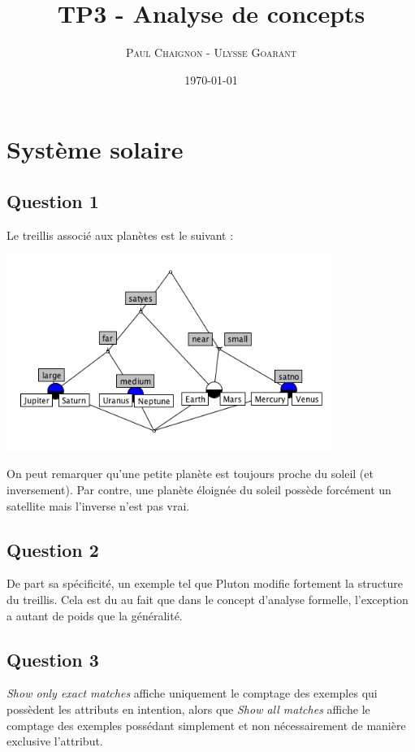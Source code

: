 \documentclass[a4paper,12pt]{article}
\title{TP3 - Analyse de concepts}
\author{\textsc{Paul Chaignon} - \textsc{Ulysse Goarant}}
\date{\today}
\begin{document}
\maketitle


\section{Système solaire}

\subsection*{Question 1}

Le treillis associé aux planètes est le suivant :

\includegraphics[width=400px]{question1.png}

On peut remarquer qu'une petite planète est toujours proche du soleil (et inversement).
Par contre, une planète éloignée du soleil possède forcément un satellite mais l'inverse n'est pas vrai.


\subsection*{Question 2}

De part sa spécificité, un exemple tel que Pluton modifie fortement la structure du treillis.
Cela est du au fait que dans le concept d'analyse formelle, l'exception a autant de poids que la généralité.


\subsection*{Question 3}

\textit{Show only exact matches} affiche uniquement le comptage des exemples qui possèdent les attributs en intention, alors que \textit{Show all matches} affiche le comptage des exemples possédant simplement et non nécessairement de manière exclusive l'attribut.
\end{document}
